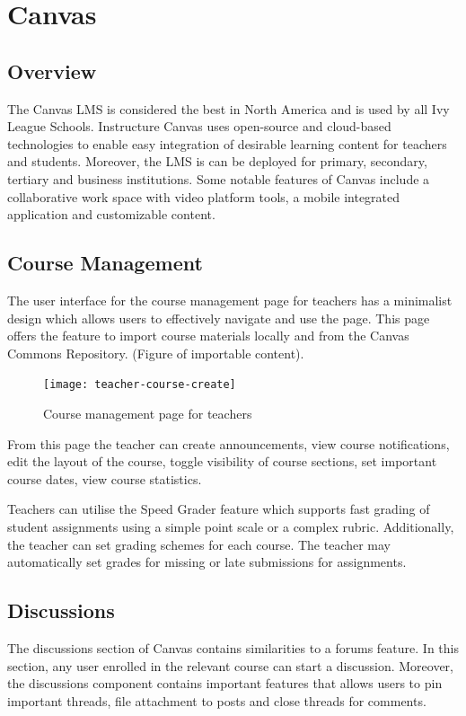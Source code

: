 \section{Canvas}

\subsection{Overview}
The Canvas LMS is considered the best in North America and is used by all Ivy League Schools. Instructure Canvas uses open-source and cloud-based technologies to enable easy integration of desirable learning content for teachers and students. Moreover, the LMS is can be deployed for primary, secondary, tertiary and business institutions. Some notable features of Canvas include a collaborative work space with video platform tools, a mobile integrated application and customizable content.

\subsection{Course Management}
The user interface for the course management page for teachers has a minimalist design which allows users to effectively navigate and use the page. This page offers the feature to import course materials locally and from the Canvas Commons Repository. (Figure of importable content). 

\begin{figure}
\texttt{[image: teacher-course-create]}
\centering
\caption{Course management page for teachers}
\end{figure}

From this page the teacher can create announcements, view course notifications, edit the layout of the course, toggle visibility of course sections, set important course dates, view course statistics.

Teachers can utilise the Speed Grader feature which supports fast grading of student assignments using a simple point scale or a complex rubric. Additionally, the teacher can set grading schemes for each course. The teacher may automatically set grades for missing or late submissions for assignments. 

\subsection{Discussions}
The discussions section of Canvas contains similarities to a forums feature. In this section, any user enrolled in the relevant course can start a discussion. Moreover, the discussions component contains important features that allows users to pin important threads, file attachment to posts and close threads for comments.


